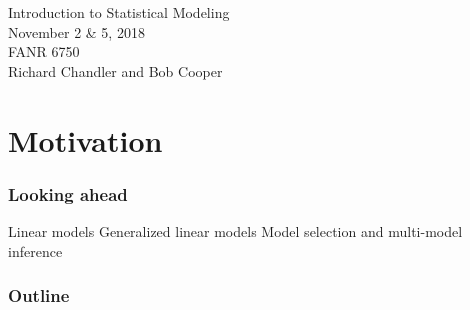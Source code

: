 \documentclass[color=usenames,dvipsnames]{beamer}\usepackage[]{graphicx}\usepackage[]{color}
\begin{document}



\begin{frame}[plain]
  \huge
  \centering \par
  \textcolor{NavyBlue}{Introduction to Statistical Modeling} \\
  \vspace{1cm}
  \Large
  November 2 \& 5, 2018 \\
  FANR 6750 \\
  \vfill
  \large
  Richard Chandler and Bob Cooper
\end{frame}


\section{Motivation}



\begin{frame}
  \frametitle{Looking ahead}
  \Large
  Linear models
  \vfill
  Generalized linear models
  \vfill
  Model selection and multi-model inference
\end{frame}






\begin{frame}
  \frametitle{Outline}
  \LARGE
\end{frame}
\end{document}
